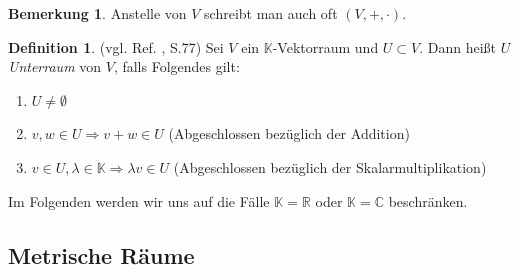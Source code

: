 \documentclass[10pt,a4paper]{article}
\theoremstyle{plain}
\theoremstyle{definition}
\newtheorem{definition}[satz]{Definition}
\newenvironment{dfi}{\begin{shaded}\begin{definition}}{\end{definition}\end{shaded}}
\theoremstyle{nonumberplain}
\newtheorem{bemerkung}{Bemerkung}
\newenvironment{bem}{\begin{bemerkung}}{\end{bemerkung}}
\newcommand{\R}{\mathbb{R}}
\newcommand{\C}{\mathbb{C}}
\newcommand{\K}{\mathbb{K}}
\begin{document}
\begin{bem}
Anstelle von $V$ schreibt man auch oft $(V,+,\cdot)$. 
\end{bem}
\begin{dfi}
\label{unterraum}
(vgl. Ref. \cite{Fischer}, S.77) Sei $V$ ein $\K$-Vektorraum und $U \subset V$. Dann heißt $U$ \textit{Unterraum} von $V$, falls Folgendes gilt:
\begin{enumerate}[label=(\roman*)]
\item $U \neq \emptyset$
\item $v,w \in U \Rightarrow v + w \in U$ (Abgeschlossen bezüglich der Addition)
\item $v \in U, \lambda \in \K \Rightarrow \lambda v \in U$ (Abgeschlossen bezüglich der Skalarmultiplikation)
\end{enumerate}
\end{dfi}
Im Folgenden werden wir uns auf die Fälle $\K = \R$ oder $\K = \C$ beschränken.
\newpage
\subsection{Metrische Räume}
\end{document}
